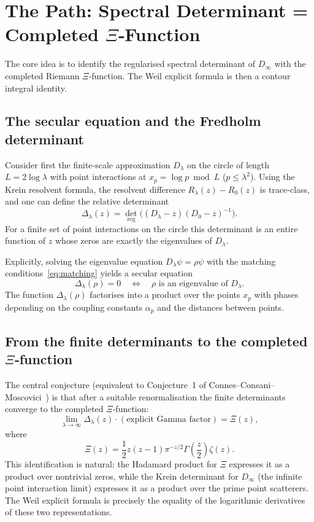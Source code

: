 \documentclass[12pt,a4paper]{article}
\newcommand{\deter}{\operatorname{det}}
\begin{document}
\section{The Path: Spectral Determinant = Completed \(\Xi\)‑Function}

The core idea is to identify the regularised spectral determinant of \(D_\infty\) with the completed Riemann \(\Xi\)‑function.  The Weil explicit formula is then a contour integral identity.

\subsection{The secular equation and the Fredholm determinant}

Consider first the finite‑scale approximation \(D_\lambda\) on the circle of length \(L = 2\log\lambda\) with point interactions at \(x_p = \log p \bmod L\) (\(p \le \lambda^2\)).  Using the Krein resolvent formula, the resolvent difference \(R_\lambda(z)-R_0(z)\) is trace‑class, and one can define the relative determinant
\[
  \Delta_\lambda(z) = {\deter}_{\text{reg}}\!\bigl( (D_\lambda - z)(D_0 - z)^{-1} \bigr).
\]
For a finite set of point interactions on the circle this determinant is an entire function of \(z\) whose zeros are exactly the eigenvalues of \(D_\lambda\).

Explicitly, solving the eigenvalue equation \(D_\lambda\psi = \rho\psi\) with the matching conditions~\eqref{eq:matching} yields a secular equation
\[
  \Delta_\lambda(\rho) = 0 \quad\Longleftrightarrow\quad \rho \text{ is an eigenvalue of } D_\lambda .
\]
The function \(\Delta_\lambda(\rho)\) factorises into a product over the points \(x_p\) with phases depending on the coupling constants \(\alpha_p\) and the distances between points.

\subsection{From the finite determinants to the completed \(\Xi\)‑function}

The central conjecture (equivalent to Conjecture~1 of Connes--Consani--Moscovici~\cite{CCM2025}) is that after a suitable renormalisation the finite determinants converge to the completed \(\Xi\)‑function:
\[
\lim_{\lambda\to\infty} \Delta_\lambda(z) \cdot (\text{explicit Gamma factor}) = \Xi(z),
\tag{3}
\]
where
\[
\Xi(z) = \frac12 z(z-1)\pi^{-z/2}\Gamma\!\left(\frac{z}{2}\right)\zeta(z).
\]
This identification is natural: the Hadamard product for \(\Xi\) expresses it as a product over nontrivial zeros, while the Krein determinant for \(D_\infty\) (the infinite point interaction limit) expresses it as a product over the prime point scatterers.  The Weil explicit formula is precisely the equality of the logarithmic derivatives of these two representations.
\end{document}
